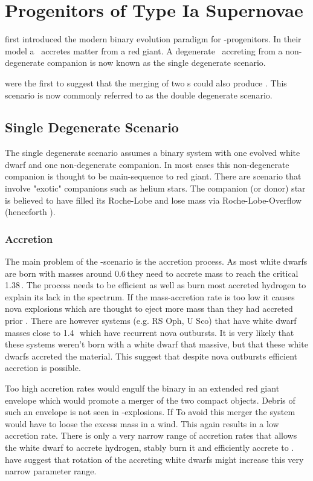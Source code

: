 \section{Progenitors of Type Ia Supernovae}
\label{sec:snia_progenitor}

\citet{1973ApJ...186.1007W} first introduced the modern binary evolution paradigm for \snia-progenitors. In their model a \cowd\ accretes matter from a red giant. A degenerate \cowd\ accreting from a non-degenerate companion is now known as the single degenerate scenario. 

\citet{1984ApJ...277..355W, 1984ApJS...54..335I} were the first to suggest that the merging of two \cowd s could also produce \sneia. This scenario is now commonly referred to as the double degenerate scenario.



\subsection{Single Degenerate Scenario}
The single degenerate scenario assumes a binary system with one evolved white dwarf and one non-degenerate companion. In most cases this non-degenerate companion is thought to be main-sequence to red giant. There are scenario that involve "exotic" companions such as helium stars. The companion (or donor) star is believed to have filled its Roche-Lobe and lose mass via Roche-Lobe-Overflow (henceforth \rlof).

\subsubsection{Accretion}
The main problem of the \sd-scenario is the accretion process.  As most white dwarfs are born with masses around 0.6\,\msun they need to accrete mass to reach the critical 1.38\,\msun. The process needs to be efficient as well as burn most accreted hydrogen to explain its lack in the spectrum.
 If the mass-accretion rate is too low it causes nova explosions which are thought to eject more mass than they had accreted prior \citep{Nomoto:1982p451}. There are however systems (e.g. RS Oph, U Sco) that have white dwarf masses close to 1.4\,\msun\ which have recurrent nova outbursts. It is very likely that these systems weren't born with a white dwarf that massive, but that these white dwarfs accreted the material. This suggest that despite nova outbursts efficient accretion is possible. 
 
 Too high accretion rates would engulf the binary in an extended red giant envelope which would promote a merger of the two compact objects. Debris of such an envelope is not seen in \snia-explosions. If To avoid this merger the system would have to loose the excess mass in a wind. This again results in a low accretion rate. There is only a very narrow range of accretion rates that allows the white dwarf to accrete hydrogen, stably burn it and efficiently accrete to \mchan. \cite{2004A&A...419..623Y} have suggest that rotation of the accreting white dwarfs might increase this very narrow parameter range.
 
